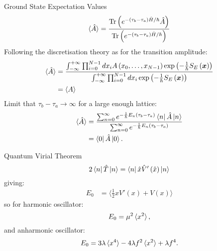 \documentclass{beamer}
\begin{document}
\begin{frame}[t,allowframebreaks]{Ground State Expectation Values}
    \begin{equation*}
            \braket{\hat{A}} = \frac{\text{Tr}\left(e^{-\left(\tau_b-\tau_a\right)\hat{H}/\hbar}\hat{A}\right)}{\text{Tr}\left(e^{-\left(\tau_b-\tau_a\right)\hat{H}/\hbar}\right)}
        \end{equation*}
         Following the discretisation theory as for the transition amplitude\cite{creutz_freedman_1981}:
        \begin{align*}
            \label{eq:SpecialEXP2}
            \braket{\hat{A}} & = \frac{\int^{+\infty}_{-\infty}\prod_{i=0}^{N-1}dx_i A\left(x_0,\dots,x_{N-1}\right)\exp{\left(-\frac{1}{\hbar}S_{E}\left(\bm{x}\right)\right)}}{\int^{+\infty}_{-\infty}\prod_{i=0}^{N-1}dx_i \exp{\left(-\frac{1}{\hbar}S_{E}\left(\bm{x}\right)\right)}}\\
            & = \langle A \rangle
        \end{align*}
        Limit that $\tau_b - \tau_a \rightarrow \infty$ for a large enough lattice: 
        \begin{align*}
            \braket{\hat{A}} & = \frac{\sum_{n=0}^{\infty}e^{-\frac{1}{\hbar}E_n\left(\tau_b-\tau_a\right)}\bra{n}\hat{A}\ket{n}}{\sum_{n=0}^{\infty}e^{-\frac{1}{\hbar}E_n\left(\tau_b-\tau_a\right)}} \\
            & = \bra{0}\hat{A}\ket{0}.
        \end{align*}
\end{frame}
\begin{frame}[t,allowframebreaks]{Quantum Virial Theorem}
    \begin{equation*}
        2\bra{n} \hat{T} \ket{n} = \bra{n} \hat{x} \hat{V}'\left(\hat{x}\right) \ket{n}
    \end{equation*}
    giving:
    \begin{align*}
            E_0 & = \langle \frac{1}{2}xV'\left(x\right) +  V\left(x\right) \rangle
    \end{align*}
    so for harmonic oscillator:
    \begin{equation*}
        E_0 = \mu^2\braket{x^2},
    \end{equation*}
    and anharmonic oscillator:
    \begin{equation*}
        E_0=3\lambda\braket{x^4}-4\lambda f^2\braket{x^2}+\lambda f^4.
    \end{equation*}
\end{frame}
\end{document}
